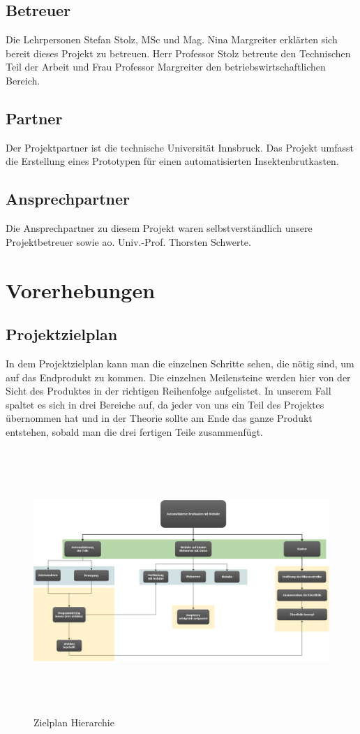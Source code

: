 \subsection{Betreuer}
Die Lehrpersonen Stefan Stolz, MSc und Mag. Nina Margreiter erklärten sich bereit dieses Projekt zu betreuen. Herr Professor Stolz betreute den Technischen Teil der Arbeit und Frau Professor Margreiter den betriebswirtschaftlichen Bereich.


\subsection{Partner}
Der Projektpartner ist die technische Universität Innsbruck. Das Projekt umfasst die Erstellung eines Prototypen für einen automatisierten Insektenbrutkasten.


\subsection{Ansprechpartner}
Die Ansprechpartner zu diesem Projekt waren selbstverständlich unsere Projektbetreuer sowie ao. Univ.-Prof. Thorsten Schwerte.




\section{Vorerhebungen}

\def \currentAuthor{Kevin Glatz}
\subsection{Projektzielplan}

In dem Projektzielplan kann man die einzelnen Schritte sehen, die nötig sind, um auf das Endprodukt zu kommen. Die einzelnen Meilensteine werden hier von der Sicht des Produktes in der richtigen Reihenfolge aufgelistet. In unserem Fall spaltet es sich in drei Bereiche auf, da jeder von uns ein Teil des Projektes übernommen hat und in der Theorie sollte am Ende das ganze Produkt entstehen, sobald man die drei fertigen Teile zusammenfügt. 

\begin{figure}
\includegraphics[height=10cm,angle=90]{figures/Zielhierachie}
\caption{Zielplan Hierarchie}
\end{figure}


